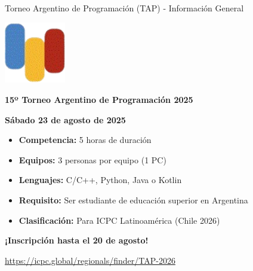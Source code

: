 \documentclass{beamer}
\begin{document}
\begin{frame}{Torneo Argentino de Programación (TAP) - Información General}
\begin{center}
\includegraphics[width=0.2\textwidth,keepaspectratio]{img/tap_logo.png}

\vspace{0.3cm}

\Large
\textbf{15º Torneo Argentino de Programación 2025}

\vspace{0.2cm}

\normalsize
\textbf{Sábado 23 de agosto de 2025}

\vspace{0.2cm}

\begin{itemize}
\item \textbf{Competencia:} 5 horas de duración
\item \textbf{Equipos:} 3 personas por equipo (1 PC)
\item \textbf{Lenguajes:} C/C++, Python, Java o Kotlin
\item \textbf{Requisito:} Ser estudiante de educación superior en Argentina
\item \textbf{Clasificación:} Para ICPC Latinoamérica (Chile 2026)
\end{itemize}

\vspace{0.2cm}

\textbf{¡Inscripción hasta el 20 de agosto!}

\vspace{0.1cm}

\small
\url{https://icpc.global/regionals/finder/TAP-2026}
\end{center}
\end{frame}
\end{document}

